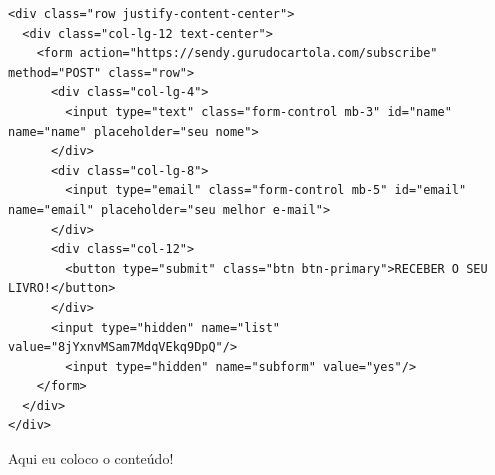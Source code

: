 \documentclass[
]{book}
\begin{document}
\begin{verbatim}
<div class="row justify-content-center">
  <div class="col-lg-12 text-center">
    <form action="https://sendy.gurudocartola.com/subscribe" method="POST" class="row">
      <div class="col-lg-4">
        <input type="text" class="form-control mb-3" id="name" name="name" placeholder="seu nome">
      </div>
      <div class="col-lg-8">
        <input type="email" class="form-control mb-5" id="email" name="email" placeholder="seu melhor e-mail">
      </div>
      <div class="col-12">
        <button type="submit" class="btn btn-primary">RECEBER O SEU LIVRO!</button>
      </div>
      <input type="hidden" name="list" value="8jYxnvMSam7MdqVEkq9DpQ"/>
        <input type="hidden" name="subform" value="yes"/>
    </form>
  </div>
</div>
\end{verbatim}

Aqui eu coloco o conteúdo!

\backmatter
\end{document}
